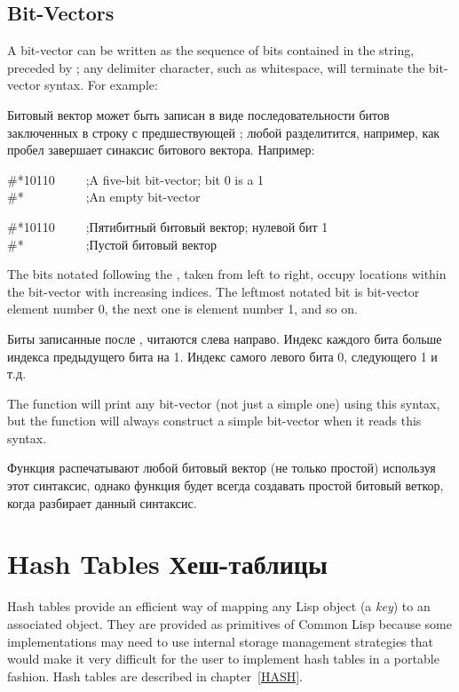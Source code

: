 \subsection{Bit-Vectors}

A bit-vector can be written as the sequence of bits contained in the
string, preceded by \cd{\#*}; any delimiter character, such as whitespace,
will terminate the bit-vector syntax.
For example:

Битовый вектор может быть записан в виде последовательности битов заключенных в
строку с предшествующей \cd{\#*}; любой разделитится, например, как пробел
завершает синаксис битового вектора.
Например:
\begin{lisp}
\#*10110~~~~~;{\rm A five-bit bit-vector; bit 0 is a 1} \\
\#*~~~~~~~~~~;{\rm An empty bit-vector}
\end{lisp}

\begin{lisp}
\#*10110~~~~~;{\rm Пятибитный битовый вектор; нулевой бит 1} \\
\#*~~~~~~~~~~;{\rm Пустой битовый вектор}
\end{lisp}

The bits notated following the \cd{\#*}, taken from left to right,
occupy locations within the bit-vector with increasing indices.
The leftmost notated bit is bit-vector element number 0, the next one
is element number 1, and so on.

Биты записанные после \cd{\#*}, читаются слева направо. Индекс каждого бита
больше индекса предыдущего бита на 1. Индекс самого левого бита 0, следующего 1
и т.д.

The function  will print any bit-vector (not just a simple one)
using this syntax, but the function  will always construct
a simple bit-vector when it reads this syntax.

Функция  распечатывают любой битовый вектор (не только простой)
используя этот синтаксис, однако функция  будет всегда создавать простой
битовый веткор, когда разбирает данный синтаксис.

\section{Hash Tables Хеш-таблицы}
Hash tables provide an efficient way of mapping any
Lisp object (a {\it key}) to an associated object.
They are provided as primitives of Common Lisp because
some implementations may need to use internal storage
management strategies that would make it very difficult
for the user to implement hash tables in a portable fashion.
Hash tables are described in chapter~\ref{HASH}.

